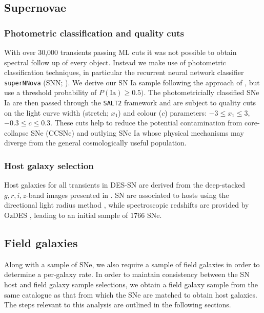 \documentclass[fleqn,usenatbib]{mnras}
\begin{document}
\subsection{Supernovae \label{subsec:host_sample}}
\subsubsection{Photometric classification and quality cuts \label{subsubsec:sn_classify}}
With over 30,000 transients passing ML cuts it was not possible to obtain spectral follow up of every object. Instead we make use of photometric classification techniques, in particular the recurrent neural network classifier \texttt{superNNova} (SNN; \citealt{Moller2019}). We derive our SN Ia sample following the approach of \citet{Scolnic2020}, but use a threshold probability of $P(\mathrm{Ia})\geq0.5)$. The photometricially classified SNe Ia are then passed through the \texttt{SALT2} framework \citep{Betoule2014} and are subject to quality cuts on the light curve width (stretch; $x_1$) and colour ($c$) parameters: $-3 \leq x_1 \leq 3$, $-0.3 \leq c \leq 0.3$. These cuts help to reduce the potential contamination from core-collapse SNe (CCSNe) and outlying SNe Ia whose physical mechanisms may diverge from the general cosmologically useful population.

\subsubsection{Host galaxy selection \label{subsubsec:sn_hosts}}
Host galaxies for all transients in DES-SN are derived from the deep-stacked $g, r, i, z$-band images presented in \citet{Wiseman2020}. SN are associated to hosts using the directional light radius method \citep[e.g.][]{Sullivan2006,Gupta2016}, while spectroscopic redshifts are provided by OzDES \citep{Yuan2015,Childress2017,Lidman2020}, leading to an initial sample of 1766 SNe.

\subsection{Field galaxies\label{subsec:field_sample}}
Along with a sample of SNe, we also require a sample of field galaxies in order to determine a per-galaxy rate. In order to maintain consistency between the SN host and field galaxy sample selections, we obtain a field galaxy sample from the same catalogue as that from which the SNe are matched to obtain host galaxies. The steps relevant to this analysis are outlined in the following sections.
\end{document}
